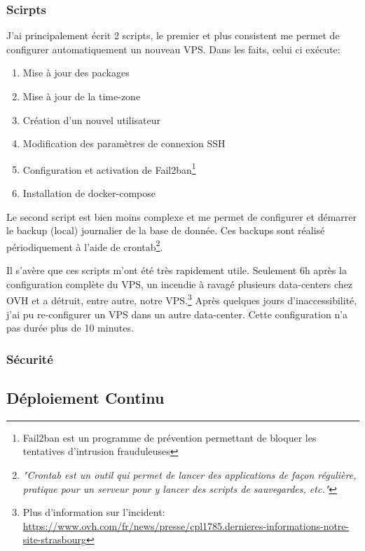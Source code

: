 \subsubsection{Scirpts}
J'ai principalement écrit 2 scripts, le premier et plus consistent me permet de configurer automatiquement un nouveau VPS. Dans les faits, celui ci exécute: 
\begin{enumerate}
  \item Mise à jour des packages
  \item Mise à jour de la time-zone
  \item Création d'un nouvel utilisateur
  \item Modification des paramètres de connexion SSH
  \item Configuration et activation de Fail2ban\footnote{Fail2ban est un programme de prévention permettant de bloquer les tentatives d'intrusion frauduleuses}
  \item Installation de docker-compose
\end{enumerate}

\newpara

Le second script est bien moins complexe et me permet de configurer et démarrer le backup (local) journalier de la base de donnée. Ces backups sont réalisé périodiquement à l'aide de crontab\footnote{\textit{"Crontab est un outil qui permet de lancer des applications de façon régulière, pratique pour un serveur pour y lancer des scripts de sauvegardes, etc."}\cite{CRON}}.

\newpara

Il s'avère que ces scripts m'ont été très rapidement utile. Seulement 6h après la configuration complète du VPS, un incendie à ravagé plusieurs data-centers chez OVH et a détruit, entre autre, notre VPS.\footnote{Plus d'information sur l'incident: \url{https://www.ovh.com/fr/news/presse/cpl1785.dernieres-informations-notre-site-strasbourg}} Après quelques jours d'inaccessibilité, j'ai pu re-configurer un VPS dans un autre data-center. Cette configuration n'a pas durée plus de 10 minutes.

\newpage

\subsubsection{Sécurité}

\newpage
\subsection{Déploiement Continu}


